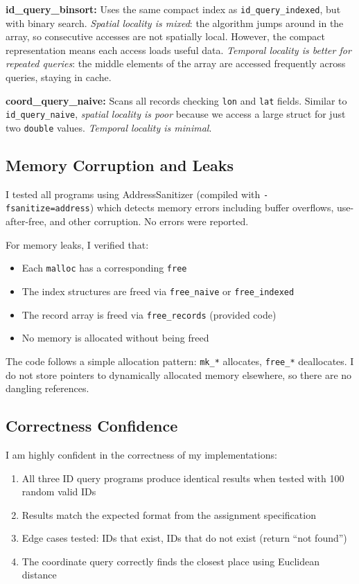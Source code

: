 \documentclass[a4paper,11pt]{article}
\begin{document}
\textbf{id\_query\_binsort:} Uses the same compact index as \texttt{id\_query\_indexed}, but with binary search. \emph{Spatial locality is mixed}: the algorithm jumps around in the array, so consecutive accesses are not spatially local. However, the compact representation means each access loads useful data. \emph{Temporal locality is better for repeated queries}: the middle elements of the array are accessed frequently across queries, staying in cache.

\textbf{coord\_query\_naive:} Scans all records checking \texttt{lon} and \texttt{lat} fields. Similar to \texttt{id\_query\_naive}, \emph{spatial locality is poor} because we access a large struct for just two \texttt{double} values. \emph{Temporal locality is minimal}.

\subsection{Memory Corruption and Leaks}

I tested all programs using AddressSanitizer (compiled with \texttt{-fsanitize=address}) which detects memory errors including buffer overflows, use-after-free, and other corruption. No errors were reported.

For memory leaks, I verified that:
\begin{itemize}
    \item Each \texttt{malloc} has a corresponding \texttt{free}
    \item The index structures are freed via \texttt{free\_naive} or \texttt{free\_indexed}
    \item The record array is freed via \texttt{free\_records} (provided code)
    \item No memory is allocated without being freed
\end{itemize}

The code follows a simple allocation pattern: \texttt{mk\_*} allocates, \texttt{free\_*} deallocates. I do not store pointers to dynamically allocated memory elsewhere, so there are no dangling references.

\subsection{Correctness Confidence}

I am highly confident in the correctness of my implementations:

\begin{enumerate}
    \item All three ID query programs produce identical results when tested with 100 random valid IDs
    \item Results match the expected format from the assignment specification
    \item Edge cases tested: IDs that exist, IDs that do not exist (return ``not found'')
    \item The coordinate query correctly finds the closest place using Euclidean distance
\end{enumerate}
\end{document}
